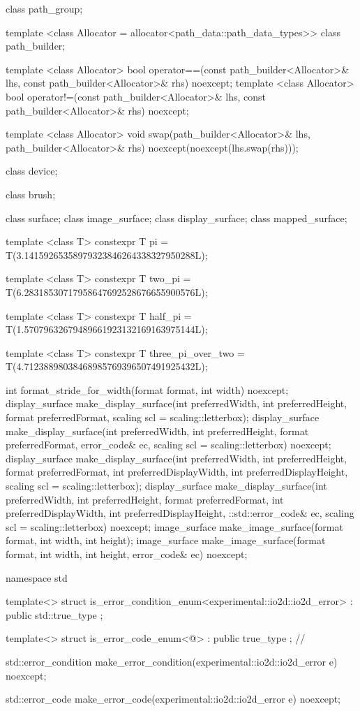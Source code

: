 \begin{codeblock}
{{{{  class path_group;

  template <class Allocator = allocator<path_data::path_data_types>>
  class path_builder;

  template <class Allocator>
  bool operator==(const path_builder<Allocator>& lhs, 
    const path_builder<Allocator>& rhs) noexcept;
  template <class Allocator>
  bool operator!=(const path_builder<Allocator>& lhs, 
    const path_builder<Allocator>& rhs) noexcept;
  
  template <class Allocator>
  void swap(path_builder<Allocator>& lhs, path_builder<Allocator>& rhs)
    noexcept(noexcept(lhs.swap(rhs)));
  
  class device;

  class brush;
  
  class surface;
  class image_surface;
  class display_surface;
  class mapped_surface;
  
  template <class T>
  constexpr T pi = T(3.14159265358979323846264338327950288L);
  
  template <class T>
  constexpr T two_pi = T(6.28318530717958647692528676655900576L);
  
  template <class T>
  constexpr T half_pi = T(1.57079632679489661923132169163975144L);
  
  template <class T>
  constexpr T three_pi_over_two = T(4.71238898038468985769396507491925432L);
  
  int format_stride_for_width(format format, int width) noexcept;
  display_surface make_display_surface(int preferredWidth,
    int preferredHeight, format preferredFormat,
    scaling scl = scaling::letterbox);
  display_surface make_display_surface(int preferredWidth,
    int preferredHeight, format preferredFormat, error_code& ec,
    scaling scl = scaling::letterbox) noexcept;
  display_surface make_display_surface(int preferredWidth,
    int preferredHeight, format preferredFormat, int preferredDisplayWidth, 
    int preferredDisplayHeight, scaling scl = scaling::letterbox);
  display_surface make_display_surface(int preferredWidth,
    int preferredHeight, format preferredFormat, int preferredDisplayWidth, 
    int preferredDisplayHeight, ::std::error_code& ec,
    scaling scl = scaling::letterbox) noexcept;
  image_surface make_image_surface(format format, int width, int height);
  image_surface make_image_surface(format format, int width, int height, 
    error_code& ec) noexcept;
} } } }

namespace std {
  template<>
  struct is_error_condition_enum<experimental::io2d::io2d_error>
    : public std::true_type{ };

  template<>
  struct is_error_code_enum<@\impdef@>
    : public true_type{ }; // \expos

  std::error_condition make_error_condition(experimental::io2d::io2d_error e) 
    noexcept;

  std::error_code make_error_code(experimental::io2d::io2d_error e) noexcept;
}

\end{codeblock}
%
